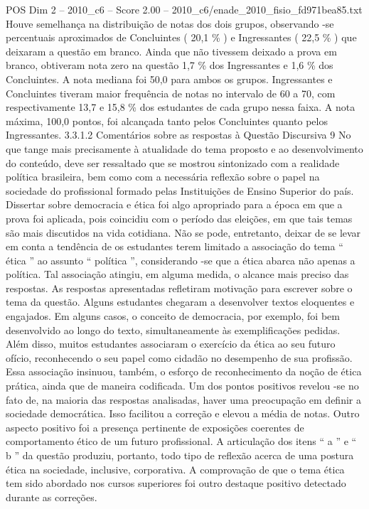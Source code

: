 \begin{textsample}{POS Dim 2 – 2010\_c6 – Score 2.00 – 2010\_c6/enade\_2010\_fisio\_fd971bea85.txt}
Houve semelhança na distribuição de notas dos dois grupos, observando -se percentuais aproximados de Concluintes ( 20,1 \% ) e Ingressantes ( 22,5 \% ) que deixaram a questão em branco.
Ainda que não tivessem deixado a prova em branco, obtiveram nota zero na questão 1,7 \% dos Ingressantes e 1,6 \% dos Concluintes.
A nota mediana foi 50,0 para ambos os grupos.
Ingressantes e Concluintes tiveram maior frequência de notas no intervalo de 60 a 70, com respectivamente 13,7 e 15,8 \% dos estudantes de cada grupo nessa faixa.
A nota máxima, 100,0 pontos, foi alcançada tanto pelos Concluintes quanto pelos Ingressantes. 3.3.1.2 Comentários sobre as respostas à Questão Discursiva 9 No que tange mais precisamente à atualidade do tema proposto e ao desenvolvimento do conteúdo, deve ser ressaltado que se mostrou sintonizado com a realidade política brasileira, bem como com a necessária reflexão sobre o papel na sociedade do profissional formado pelas Instituições de Ensino Superior do país.
Dissertar sobre democracia e ética foi algo apropriado para a época em que a prova foi aplicada, pois coincidiu com o período das eleições, em que tais temas são mais discutidos na vida cotidiana.
Não se pode, entretanto, deixar de se levar em conta a tendência de os estudantes terem limitado a associação do tema “ ética ” ao assunto “ política ”, considerando -se que a ética abarca não apenas a política.
Tal associação atingiu, em alguma medida, o alcance mais preciso das respostas.
As respostas apresentadas refletiram motivação para escrever sobre o tema da questão.
Alguns estudantes chegaram a desenvolver textos eloquentes e engajados.
Em alguns casos, o conceito de democracia, por exemplo, foi bem desenvolvido ao longo do texto, simultaneamente às exemplificações pedidas.
Além disso, muitos estudantes associaram o exercício da ética ao seu futuro ofício, reconhecendo o seu papel como cidadão no desempenho de sua profissão.
Essa associação insinuou, também, o esforço de reconhecimento da noção de ética prática, ainda que de maneira codificada.
Um dos pontos positivos revelou -se no fato de, na maioria das respostas analisadas, haver uma preocupação em definir a sociedade democrática.
Isso facilitou a correção e elevou a média de notas.
Outro aspecto positivo foi a presença pertinente de exposições coerentes de comportamento ético de um futuro profissional.
A articulação dos itens “ a ” e “ b ” da questão produziu, portanto, todo tipo de reflexão acerca de uma postura ética na sociedade, inclusive, corporativa.
A comprovação de que o tema ética tem sido abordado nos cursos superiores foi outro destaque positivo detectado durante as correções.

\end{textsample}
